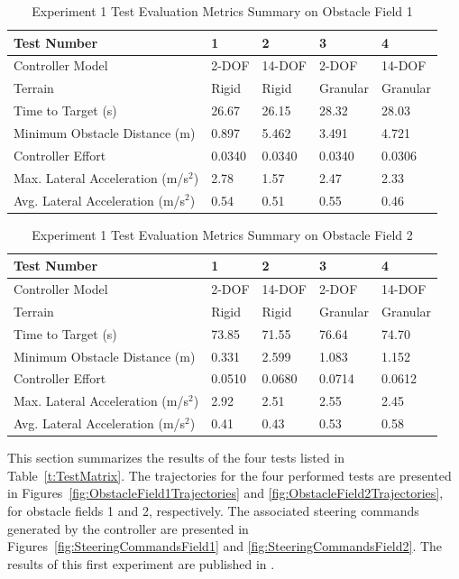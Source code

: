 \documentclass[12pt,onecolumn]{report}
\begin{document}
\begin{table}
		\centering
\begin{tabular}{ ||p{6cm}|p{1.8cm}|p{1.8cm}|p{1.8cm}|p{1.8cm}||  }
		\hline
		Test Number & 1 & 2 & 3 & 4\\
		\hline
		Controller Model & 2-DOF & 14-DOF & 2-DOF & 14-DOF\\
		\hline
		Terrain & Rigid & Rigid & Granular & Granular\\
		\hline
		Time to Target (s)  & 26.67 & 26.15 & 28.32 & 28.03\\ 
		\hline
		Minimum Obstacle Distance (m) & 0.897 & 5.462 & 3.491 & 4.721\\
		\hline
		Controller Effort & 0.0340 & 0.0340 & 0.0340 & 0.0306\\
		\hline
		Max. Lateral Acceleration (m/s$^{2}$)& 2.78 & 1.57 & 2.47 & 2.33 \\
		\hline
		Avg. Lateral Acceleration (m/s$^{2}$) &0.54 & 0.51 & 0.55 & 0.46\\
		\hline
\end{tabular}
\caption{Experiment 1 Test Evaluation Metrics Summary on Obstacle Field 1}
\label{t:EvalMetricsObst1}
\end{table}

\begin{table}
		\centering
\begin{tabular}{ ||p{6cm}|p{1.8cm}|p{1.8cm}|p{1.8cm}|p{1.8cm}||  }
		\hline
		Test Number & 1 & 2 & 3 & 4\\
		\hline
		Controller Model & 2-DOF & 14-DOF & 2-DOF & 14-DOF\\
		\hline
		Terrain & Rigid & Rigid & Granular & Granular\\
		\hline
		Time to Target (s)  & 73.85 & 71.55 & 76.64 & 74.70\\ 
		\hline
		Minimum Obstacle Distance (m) & 0.331 & 2.599 & 1.083 & 1.152\\
		\hline
		Controller Effort & 0.0510 & 0.0680 & 0.0714 & 0.0612\\
		\hline
		Max. Lateral Acceleration (m/s$^{2}$)& 2.92 & 2.51 & 2.55 & 2.45 \\
		\hline
		Avg. Lateral Acceleration (m/s$^{2}$) & 0.41 & 0.43 & 0.53 & 0.58\\
		\hline
\end{tabular}
\caption{Experiment 1 Test Evaluation Metrics Summary on Obstacle Field 2}
\label{t:EvalMetricsObst2}
\end{table}

This section summarizes the results of the four tests listed in Table~\ref{t:TestMatrix}. The trajectories for the four performed tests are presented in Figures~\ref{fig:ObstacleField1Trajectories} and \ref{fig:ObstacleField2Trajectories}, for obstacle fields 1 and 2, respectively. The associated steering commands generated by the controller are presented in Figures~\ref{fig:SteeringCommandsField1} and \ref{fig:SteeringCommandsField2}. The results of this first experiment are published in \cite{GVSETS2017}.
\end{document}
